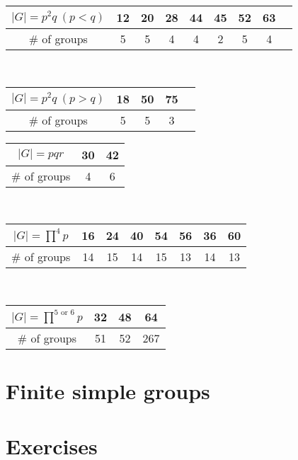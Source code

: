 \documentclass{../note}
\begin{document}
\begin{prb}
\end{prb}





\begin{table}[h!]
\centering
\begin{tabular}{c|c|ccccccc}
\hline
$|G|=p^2q\ (p<q)$&12&20&28&44&45&52&63\\
\hline
$\#$ of groups&5&5&4&4&2&5&4\\
\hline
\end{tabular}
\vspace{10pt}\\
\begin{tabular}{c|cccc}
\hline
$|G|=p^2q\ (p>q)$&18&50&75\\
\hline
$\#$ of groups&5&5&3\\
\hline
\end{tabular}
\hspace{10pt}
\begin{tabular}{c|cc}
\hline
$|G|=pqr$&30&42\\
\hline
$\#$ of groups&4&6\\
\hline
\end{tabular}
\vspace{10pt}\\
\begin{tabular}{c|c|cccc|c|c}
\hline
$|G|=\prod^4p$&16&24&40&54&56&36&60\\
\hline
$\#$ of groups&14&15&14&15&13&14&13\\
\hline
\end{tabular}
\vspace{10pt}\\
\begin{tabular}{c|c|c||c}
\hline
$|G|=\prod^{5\text{ or }6}p$&32&48&64\\
\hline
$\#$ of groups&51&52&267\\
\hline
\end{tabular}
\end{table}


\section{Finite simple groups}






\section*{Exercises}
\begin{prb}
\end{prb}
\end{document}
